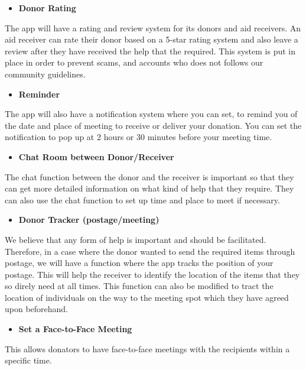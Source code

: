 \documentclass[conference]{IEEEtran}
\begin{document}
\begin{itemize}
\item \textbf{Donor Rating}
\end{itemize}
\par The app will have a rating and review system for its donors and aid receivers. An aid receiver can rate their donor based on a 5-star rating system and also leave a review after they have received the help that the required. This system is put in place in order to prevent scams, and accounts who does not follows our community guidelines.\\
\begin{itemize}
\item \textbf{Reminder}
\end{itemize}
\par The app will also have a notification system where you can set, to remind you of the date and place of meeting to receive or deliver your donation. You can set the notification to pop up at 2 hours or 30 minutes before your meeting time.\\
\begin{itemize}
\item \textbf{Chat Room between Donor/Receiver}
\end{itemize}
\par The chat function between the donor and the receiver is important so that they can get more detailed information on what kind of help that they require. They can also use the chat function to set up time and place to meet if necessary.\\
\begin{itemize}
\item \textbf{Donor Tracker (postage/meeting)}
\end{itemize}
\par We believe that any form of help is important and should be facilitated. Therefore, in a case where the donor wanted to send the required items through postage, we will have a function where the app tracks the position of your postage. This will help the receiver to identify the location of the items that they so direly need at all times. This function can also be modified to tract the location of individuals on the way to the meeting spot which they have agreed upon beforehand.\\
\begin{itemize}
\item  \textbf{Set a Face-to-Face Meeting}
\end{itemize}
\par This allows donators to have face-to-face meetings with the recipients within a specific time. 
\end{document}
